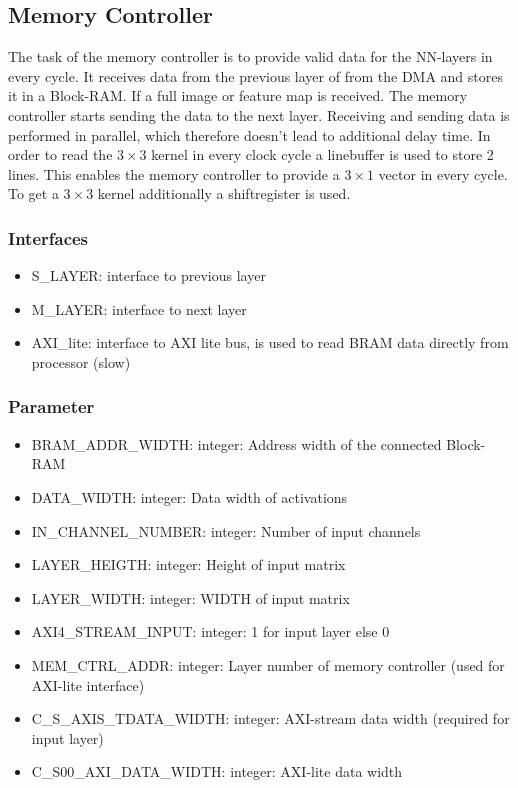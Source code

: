 \subsection{Memory Controller}
The task of the memory controller is to provide valid data for the NN-layers in every cycle. It receives data from the previous layer of from the DMA and stores it in a Block-RAM. If a full image or feature map is received. The memory controller starts sending the data to the next layer. Receiving and sending data is performed in parallel, which therefore doesn't lead to additional delay time.  In order to read the $3\times3$ kernel in every clock cycle a linebuffer is used to store 2 lines. This enables the memory controller to provide a $3\times1$ vector in every cycle. To get a $3\times3$ kernel additionally a shiftregister is used.  

\subsubsection{Interfaces}
\begin{itemize}
	\item S\_LAYER: interface to previous layer
	\item M\_LAYER: interface to next layer 
	\item AXI\_lite: interface to AXI lite bus, is used to read BRAM data directly from processor (slow)
\end{itemize}

\subsubsection{Parameter}
\begin{itemize}
	\item BRAM\_ADDR\_WIDTH: integer: Address width of the connected Block-RAM
	\item DATA\_WIDTH: integer: Data width of activations
	\item IN\_CHANNEL\_NUMBER: integer: Number of input channels 
	\item LAYER\_HEIGTH: integer: Height of input matrix 
	\item LAYER\_WIDTH: integer: WIDTH of input matrix 
	\item AXI4\_STREAM\_INPUT: integer: 1 for input layer else 0 
	\item MEM\_CTRL\_ADDR: integer: Layer number of memory controller (used for AXI-lite interface)
	\item C\_S\_AXIS\_TDATA\_WIDTH: integer: AXI-stream data width (required for input layer)
	\item C\_S00\_AXI\_DATA\_WIDTH: integer: AXI-lite data width 
\end{itemize}

